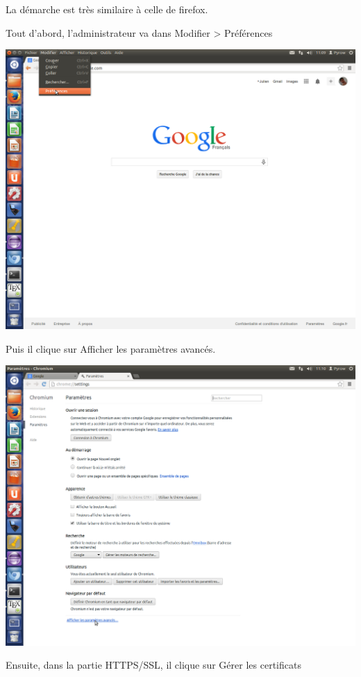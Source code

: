 \documentclass[a4paper,11pt,french]{article}
\begin{document}
La démarche est très similaire à celle de firefox.

Tout d'abord, l'administrateur va dans Modifier > Préférences

\includegraphics[width=\textwidth]{images/ChromePref.png} 
\newpage

Puis il clique sur Afficher les paramètres avancés.

\includegraphics[width=\textwidth]{images/ChromeAvance.png} 
\newpage

Ensuite, dans la partie HTTPS/SSL, il clique sur Gérer les certificats
\end{document}

